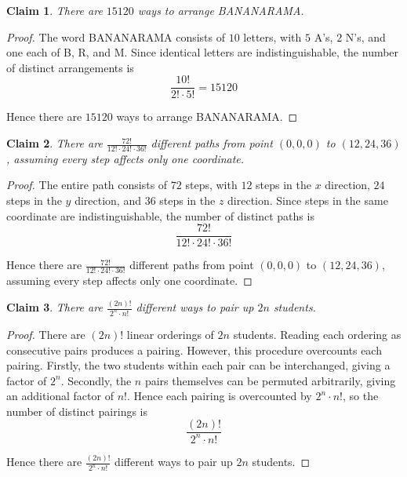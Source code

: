 \documentclass{article}
\newtheorem{claim}{Claim}
\begin{document}
\begin{claim}
    There are $15120$ ways to arrange BANANARAMA.
\end{claim}

\begin{proof}
    The word BANANARAMA consists of $10$ letters, with $5$ A's, $2$ N's, and one each of B, R, and M.
    Since identical letters are indistinguishable, the number of distinct arrangements is
    \[
    \frac{10!}{2! \cdot 5!} = 15120
    \]

    \medskip

    Hence there are $15120$ ways to arrange BANANARAMA.
\end{proof}

\begin{claim}
    There are $\frac{72!}{12! \cdot 24! \cdot 36!}$ different paths from point $(0, 0, 0)$ to 
    $(12, 24, 36)$, assuming every step affects only one coordinate.
\end{claim}

\begin{proof}
    The entire path consists of $72$ steps, with $12$ steps in the $x$ direction, $24$ steps in the $y$ 
    direction, and $36$ steps in the $z$ direction. Since steps in the same coordinate are 
    indistinguishable, the number of distinct paths is
    \[
    \frac{72!}{12! \cdot 24! \cdot 36!}
    \]

    \medskip

    Hence there are $\frac{72!}{12! \cdot 24! \cdot 36!}$ different paths from point $(0, 0, 0)$ to 
    $(12, 24, 36)$, assuming every step affects only one coordinate.
\end{proof}

\begin{claim}
    There are $\frac{(2n)!}{2^n \cdot n!}$ different ways to pair up $2n$ students.
\end{claim}

\begin{proof}
    There are $(2n)!$ linear orderings of $2n$ students. Reading each ordering as consecutive pairs 
    produces a pairing. However, this procedure overcounts each pairing. Firstly, the two students 
    within each pair can be interchanged, giving a factor of $2^n$. Secondly, the $n$ pairs 
    themselves can be permuted arbitrarily, giving an additional factor of $n!$. Hence each pairing 
    is overcounted by $2^n \cdot n!$, so the number of distinct pairings is
    \[
    \frac{(2n)!}{2^n \cdot n!}
    \]

    \medskip

    Hence there are $\frac{(2n)!}{2^n \cdot n!}$ different ways to pair up $2n$ students.
\end{proof}
\end{document}
